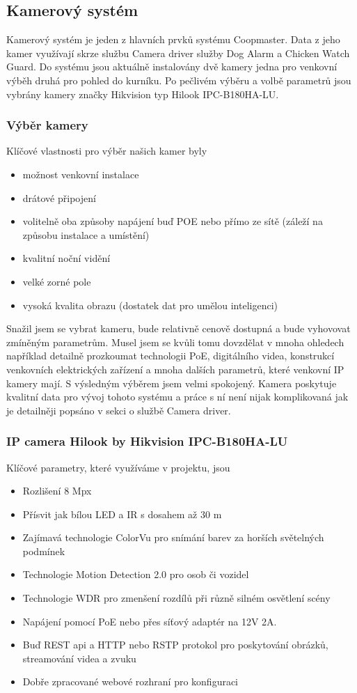 
\subsection{Kamerový systém}\label{subsec:kamerovy-system}
Kamerový systém je jeden z hlavních prvků systému Coopmaster.
Data z jeho kamer využívají skrze službu Camera driver služby Dog Alarm a Chicken Watch Guard.
Do systému jsou aktuálně instalovány dvě kamery jedna pro venkovní výběh druhá pro pohled do kurníku.
Po pečlivém výběru a volbě parametrů jsou vybrány kamery značky Hikvision typ Hilook IPC-B180HA-LU.

\subsubsection{Výběr kamery}
Klíčové vlastnosti pro výběr našich kamer byly
\begin{itemize}
    \item možnost venkovní instalace
    \item drátové připojení
    \item volitelně oba způsoby napájení buď POE nebo přímo ze sítě (záleží na způsobu instalace a umístění)
    \item kvalitní noční vidění
    \item velké zorné pole
    \item vysoká kvalita obrazu (dostatek dat pro umělou inteligenci)
\end{itemize}
Snažil jsem se vybrat kameru, bude relativně cenově dostupná a bude vyhovovat zmíněným parametrům.
Musel jsem se kvůli tomu dovzdělat v mnoha ohledech například detailně prozkoumat technologii PoE, digitálního videa, konstrukcí venkovních elektrických zařízení a mnoha dalších parametrů, které venkovní IP kamery mají.
S výsledným výběrem jsem velmi spokojený.
Kamera poskytuje kvalitní data pro vývoj tohoto systému a práce s ní není nijak komplikovaná jak je detailněji popsáno v sekci o službě Camera driver.

\subsubsection{IP camera Hilook by Hikvision IPC-B180HA-LU}
Klíčové parametry, které využíváme v projektu, jsou
\begin{itemize}
    \item Rozlišení 8 Mpx
    \item Přísvit jak bílou LED a IR s dosahem až 30 m
    \item Zajímavá technologie ColorVu pro snímání barev za horších světelných podmínek
    \item Technologie Motion Detection 2.0 pro osob či vozidel
    \item Technologie WDR pro zmenšení rozdílů při různě silném osvětlení scény
    \item Napájení pomocí PoE nebo přes síťový adaptér na 12V 2A.
    \item Buď REST api a HTTP nebo RSTP protokol pro poskytování obrázků, streamování videa a zvuku
    \item Dobře zpracované webové rozhraní pro konfiguraci
\end{itemize}

%
%
%
